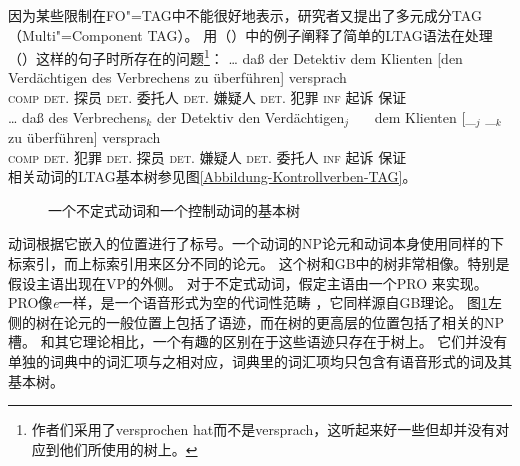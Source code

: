 因为某些限制在FO"=TAG中不能很好地表示\citep[--50]{Rambow94a}，研究者又提出了多元成分TAG（Multi"=Component TAG）。%
 \citet*{JBR2000a}用（）中的例子阐释了简单的LTAG语法在处理（）这样的句子时所存在的问题\footnote{%
  作者们采用了versprochen hat而不是versprach，这听起来好一些但却并没有对应到他们所使用的树上。
}：
\eal
\ex 
\gll \ldots{} daß  der        Detektiv  dem        Klienten [den Verdächtigen des Verbrechens zu überführen] versprach\\
{}  \textsc{comp}  \textsc{det}.\nom{} 探员 \textsc{det}.\dat{} 委托人   \spacebr{}\textsc{det}.\acc{} 嫌疑人 \textsc{det}.\gen{} 犯罪 \textsc{inf} 起诉 保证\\
\ex\label{Beispiel-Joshi-NP4} 
\gll \ldots{} daß  des        Verbrechens$_k$ der        Detektiv  den Verdächtigen$_j$~~~ dem         Klienten [\_$_j$ \_$_k$ zu überführen] versprach\\
{}     \textsc{comp}  \textsc{det}.\gen{} 犯罪           \textsc{det}.\nom{} 探员 \textsc{det}.\acc{} 嫌疑人   \textsc{det}.\dat{}  委托人   {}      {}     \textsc{inf} 起诉  保证\\
\zl
相关动词的LTAG基本树参见图\vref{Abbildung-Kontrollverben-TAG}。
\begin{figure}
\oneline{%
\begin{forest}
tag, baseline
[S
	[NP$_2^2\downarrow$]
	[S
		[NP$_2^1\downarrow$]
		[S
			[NP
				[PRO]]
			[VP
				[NP$_2^1$
					[e]]
				[NP$_2^2$
					[e]]
				[V$_2$
					[zu überführen;\textsc{inf} 起诉]]]]]]
\end{forest}
\begin{forest}
tag, baseline
[S
	[NP$_1^1\downarrow$]
	[VP
		[NP$_1^2\downarrow$]
		[S*]
		[V$_1$
		[versprach;保证]]]]
\end{forest}
}
\caption{\label{Abbildung-Kontrollverben-TAG}一个不定式动词和一个控制动词的基本树} 
\end{figure}%
动词根据它嵌入的位置进行了标号。一个动词的NP论元和动词本身使用同样的下标索引，而上标索引用来区分不同的论元。
这个树和GB\indexgbc 中的树非常相像。特别是假设主语出现在VP的外侧。
对于不定式动词，假定主语由一个PRO
来实现。PRO像\emph{e}一样，是一个语音形式为空的代词性范畴
，它同样源自GB理论。
图\ref{Abbildung-Kontrollverben-TAG}左侧的树在论元的一般位置上包括了语迹，而在树的更高层的位置包括了相关的NP槽。
和其它理论相比，一个有趣的区别在于这些语迹只存在于树上。
它们并没有单独的词典中的词汇项与之相对应，词典里的词汇项均只包含有语音形式的词及其基本树。

